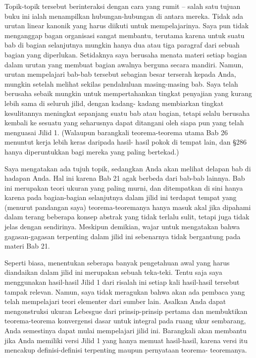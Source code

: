 Topik-topik tersebut berinteraksi dengan cara yang rumit -- salah satu
tujuan buku ini ialah menampilkan hubungan-hubungan di antara mereka.
Tidak ada urutan linear kanonik yang harus diikuti untuk mempelajarinya.
Saya pun tidak menganggap bagan organisasi sangat membantu, terutama
karena untuk suatu bab di bagian selanjutnya mungkin hanya dua atau tiga
paragraf dari sebuah bagian yang diperlukan. Setidaknya saya berusaha
menata materi setiap bagian dalam urutan yang membuat bagian awalnya
berguna secara mandiri. Namun, urutan mempelajari bab-bab tersebut sebagian
besar terserah kepada Anda, mungkin setelah melihat sekilas pendahuluan
masing-masing bab. Saya telah berusaha sebaik mungkin untuk mempertahankan
tingkat penyajian yang kurang lebih sama di seluruh jilid, dengan kadang-
kadang membiarkan tingkat kesulitannya meningkat sepanjang suatu bab atau
bagian, tetapi selalu berusaha kembali ke sesuatu yang seharusnya dapat
ditangani oleh siapa pun yang telah menguasai Jilid 1. (Walaupun barangkali
teorema-teorema utama Bab 26 menuntut kerja lebih keras daripada hasil-
hasil pokok di tempat lain, dan \S286 hanya diperuntukkan bagi mereka yang
paling bertekad.)
 
Saya mengatakan ada tujuh topik, sedangkan Anda akan melihat delapan bab
di hadapan Anda. Hal ini karena Bab 21 agak berbeda dari bab-bab lainnya.
Bab ini merupakan teori ukuran yang paling murni, dan ditempatkan di sini
hanya karena pada bagian-bagian selanjutnya dalam jilid ini terdapat tempat
yang (menurut pandangan saya) teorema-teoremanya hanya masuk akal jika
dipahami dalam terang beberapa konsep abstrak yang tidak terlalu sulit,
tetapi juga tidak jelas dengan sendirinya. Meskipun demikian, wajar untuk
mengatakan bahwa gagasan-gagasan terpenting dalam jilid ini sebenarnya
tidak bergantung pada materi Bab 21.
 
Seperti biasa, menentukan seberapa banyak pengetahuan awal yang harus
diandaikan dalam jilid ini merupakan sebuah teka-teki. Tentu saja saya
menggunakan hasil-hasil Jilid 1 dari risalah ini setiap kali hasil-hasil
tersebut tampak relevan. Namun, saya tidak meragukan bahwa akan ada pembaca
yang telah mempelajari teori elementer dari sumber lain. Asalkan Anda dapat
mengonstruksi ukuran Lebesgue dari prinsip-prinsip pertama dan membuktikan
teorema-teorema konvergensi dasar untuk integral pada ruang ukur sembarang,
Anda semestinya dapat mulai mempelajari jilid ini. Barangkali akan membantu
jika Anda memiliki versi Jilid 1 yang hanya memuat hasil-hasil, karena versi
itu mencakup definisi-definisi terpenting maupun pernyataan teorema-
teoremanya.
 
